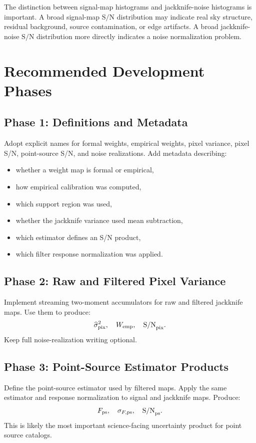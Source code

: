 \documentclass[11pt]{article}
\newcommand{\snr}{\mathrm{S/N}}
\begin{document}
The distinction between signal-map histograms and jackknife-noise histograms is
important. A broad signal-map \(\snr\) distribution may indicate real sky
structure, residual background, source contamination, or edge artifacts. A
broad jackknife-noise \(\snr\) distribution more directly indicates a noise
normalization problem.

\section{Recommended Development Phases}

\subsection{Phase 1: Definitions and Metadata}

Adopt explicit names for formal weights, empirical weights, pixel variance,
pixel S/N, point-source S/N, and noise realizations. Add metadata describing:

\begin{itemize}[leftmargin=1.5em]
\item whether a weight map is formal or empirical,
\item how empirical calibration was computed,
\item which support region was used,
\item whether the jackknife variance used mean subtraction,
\item which estimator defines an S/N product,
\item which filter response normalization was applied.
\end{itemize}

\subsection{Phase 2: Raw and Filtered Pixel Variance}

Implement streaming two-moment accumulators for raw and filtered jackknife maps.
Use them to produce:
\[
  \widehat{\sigma}^2_{\rm pix},
  \quad
  W_{\rm emp},
  \quad
  \snr_{\rm pix}.
\]
Keep full noise-realization writing optional.

\subsection{Phase 3: Point-Source Estimator Products}

Define the point-source estimator used by filtered maps. Apply the same
estimator and response normalization to signal and jackknife maps. Produce:
\[
  F_{\rm ps},
  \quad
  \sigma_{F,\rm ps},
  \quad
  \snr_{\rm ps}.
\]
This is likely the most important science-facing uncertainty product for point
source catalogs.
\end{document}
